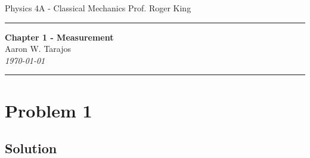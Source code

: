 \documentclass{article}
\begin{document}
\noindent
Physics 4A - Classical Mechanics \hfill Prof. Roger King

\noindent\rule{\textwidth}{0.4pt}

\begin{center}
    \textbf{\LARGE Chapter 1 - Measurement} \\
    \vspace{12pt}
    \large Aaron W. Tarajos \\
    \textit{\today}
\end{center}

\noindent\rule{\textwidth}{0.4pt}

\section*{Problem 1}

\subsection*{Solution}
\end{document}
